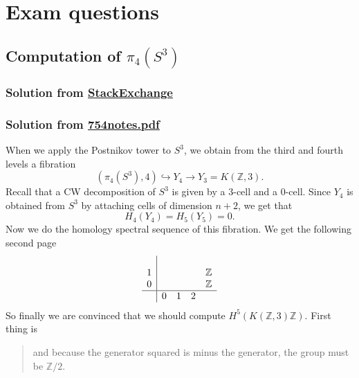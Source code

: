 \documentclass{article}
\numberwithin{equation}{section}
\newcommand{\Z}{\mathbb{Z}}
\begin{document}
\section{Exam questions}\label{sec:Exam questions}
\subsection{Computation of $\pi_{4}(S^{3})$}\label{ssec:Computation of }
\subsubsection{Solution from  \href{https://math.stackexchange.com/questions/1102897/computing-pi-4s3-using-serre-spectral-sequence}{StackExchange}}


\subsubsection{Solution from \href{https://people.math.wisc.edu/~lmaxim/754notes.pdf}{754notes.pdf}}\label{ssec:Solution of }
When we apply the Postnikov tower to $S^{3}$, we obtain from the third and fourth levels a fibration
\[(\pi_{4}(S^{3}),4)\hookrightarrow Y_{4}\to Y_3=K(\mathbb{Z},3).\]
Recall that a CW decomposition of $S^{3}$ is given by a 3-cell and a 0-cell. Since $Y_4$ is obtained from $S^{3} $ by attaching cells of dimension $n+2$, we get that
\[H_{4}(Y_{4})=H_{5}(Y_5)=0.\]
Now we do the homology spectral sequence of this fibration. We get the following second page
	\begin{align*}
		\begin{array}{c|cccc}
			&&&&\\
			1&&&&\Z\\
			0&&&&\Z\\
			\hline
			 &0&1&2&
		\end{array}
	\end{align*}
So finally we are convinced that we should compute $H^{5}(K(\mathbb{Z},3)\mathbb{Z})$. First thing is 

\begin{quotation}
	and because the generator squared is minus the generator, the group must be $\mathbb{Z}/2$.
\end{quotation}

\printbibliography
\clearpage
\end{document}
